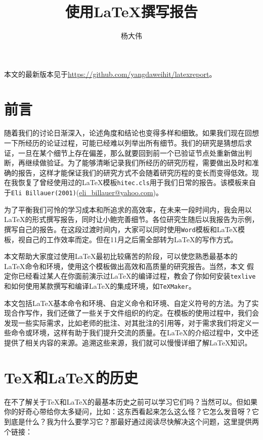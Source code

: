 \documentclass{hitec}
\title{使用\LaTeX{}撰写报告}
\author{杨大伟}
\begin{document}
\maketitle
%
本文的最新版本见于\url{https://github.com/yangdaweihit/latexreport}。

\tableofcontents
\section{前言}
随着我们的讨论日渐深入，论述角度和结论也变得多样和细致。如果我们现在回想一下所经历的论证过程，可能已经难以列举出所有细节。我们的研究是猜想后求证，一旦在某个细节上存在偏差，那么就要回到前一个已验证节点处重新做出判断，再继续做验证。为了能够清晰记录我们所经历的研究历程，需要做出及时和准确的报告，这样才能保证我们的研究方式不会随着研究历程的变长而变得低效。现在我恢复了曾经使用过的\LaTeX{}模板\texttt{hitec.cls}用于我们日常的报告。该模板来自于\texttt{Eli Billauer(2001)}(\url{eli_billauer@yahoo.com})。

为了平衡我们可怜的学习成本和所追求的高效率，在未来一段时间内，我会用以\LaTeX{}的形式撰写报告，同时让小鲍完善细节。各位研究生随后以我报告为示例，撰写自己的报告。在这段过渡时间内，大家可以同时使用\texttt{Word}模板和\LaTeX{}模板，视自己的工作效率而定。但在11月之后需全部转为\LaTeX{}的写作方式。

本文帮助大家度过使用\LaTeX{}最初比较痛苦的阶段，可以使您熟悉最基本的
\LaTeX{}命令和环境，使用这个模板做出高效和高质量的研究报告。当然，本文
假定你已经看过某人在你面前演示过\LaTeX{}的编译过程，教会了你如何安装\texttt{texlive}和如何使用某款撰写和编译\LaTeX{}的集成环境，如\texttt{TeXMaker}。

本文包括\LaTeX{}基本命令和环境、自定义命令和环境、自定义符号的方法。为了实现合作写作，我们还做了一些关于文件组织的约定。在模板的使用过程中，我们会发现一些实际需求，比如老师的批注、对其批注的引用等，对于需求我们将定义一些命令或环境，这样有助于我们提升交流的质量。在\LaTeX{}的介绍过程中，文中还提供了相关内容的来源。追溯这些来源，我们就可以慢慢详细了解\LaTeX{}知识。

\section{\TeX{}和\LaTeX{}的历史}
在不了解关于\TeX{}和\LaTeX{}的最基本历史之前可以学习它们吗？当然可以。但如果你的好奇心带给你太多疑问，比如：这东西看起来怎么这么怪？它怎么发音呀？它到底是什么？我为什么要学习它？那最好通过阅读尽快解决这个问题，这里提供两个链接：
\end{document}
